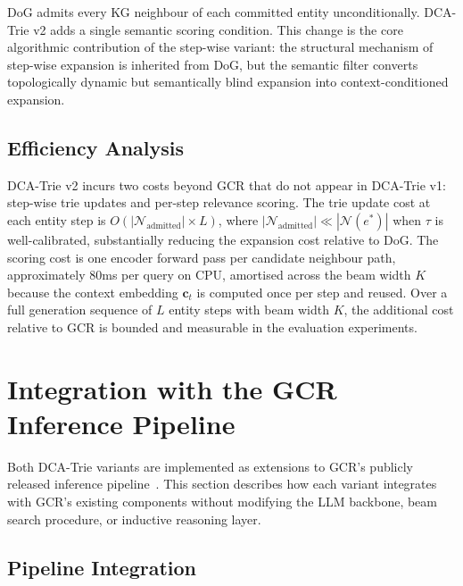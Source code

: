 DoG admits every KG neighbour of each committed entity unconditionally. DCA-Trie v2 adds a single semantic scoring condition. This change is the core algorithmic contribution of the step-wise variant: the structural mechanism of step-wise expansion is inherited from DoG, but the semantic filter converts topologically dynamic but semantically blind expansion into context-conditioned expansion.

\subsection{Efficiency Analysis}

DCA-Trie v2 incurs two costs beyond GCR that do not appear in DCA-Trie v1: step-wise trie updates and per-step relevance scoring. The trie update cost at each entity step is $O(|\mathcal{N}_{\text{admitted}}| \times L)$, where $|\mathcal{N}_{\text{admitted}}| \ll |\mathcal{N}(e^*)|$ when $\tau$ is well-calibrated, substantially reducing the expansion cost relative to DoG. The scoring cost is one encoder forward pass per candidate neighbour path, approximately 80ms per query on CPU, amortised across the beam width $K$ because the context embedding $\mathbf{c}_t$ is computed once per step and reused. Over a full generation sequence of $L$ entity steps with beam width $K$, the additional cost relative to GCR is bounded and measurable in the evaluation experiments.

\section{Integration with the GCR Inference Pipeline}
\label{sec:integration}

Both DCA-Trie variants are implemented as extensions to GCR's publicly released inference pipeline~\citep{luo2024gcr}. This section describes how each variant integrates with GCR's existing components without modifying the LLM backbone, beam search procedure, or inductive reasoning layer.

\subsection{Pipeline Integration}

